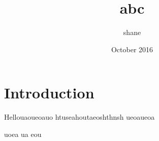 \documentclass{article}
\title{abc}
\author{shane }
\date{October 2016}
\begin{document}
\maketitle

\section{Introduction}


Hellouaoueoauo htuseahoutaeoshthnsh
ueoaueoa



uoea
ua
eou
\end{document}

